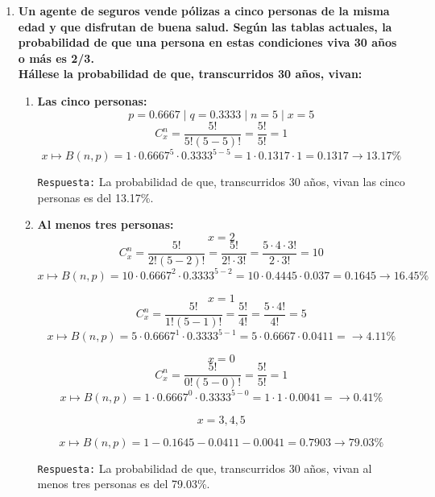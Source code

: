 \documentclass[12pt]{article}
\begin{document}
\begin{enumerate}[label=\textbf{\arabic*.}]
\begin{enumerate}[label=\textbf{\alph*.}]
        \end{enumerate}


        \newpage
        \item \textbf{Un agente de seguros vende pólizas a cinco personas de la misma edad y que disfrutan
        de buena salud. Según las tablas actuales, la probabilidad de que una persona en estas
        condiciones viva 30 años o más es 2/3.\\
        Hállese la probabilidad de que, transcurridos 30 años, vivan:}

        \begin{enumerate}[label=\textbf{\alph*.}]
            \item \textbf{Las cinco personas:}
            \[p = 0.6667 \mid q = 0.3333 \mid n = 5 \mid x = 5\]
            \[C^{n}_{x} = \frac{5!}{5!(5-5)!} = \frac{5!}{5!} = 1\]
            \[x \mapsto B(n, p) = 1 \cdot 0.6667^{5} \cdot 0.3333^{5-5} = 1 \cdot 0.1317 \cdot 1 = 0.1317 \rightarrow 13.17\%\]
            
            \texttt{Respuesta:} La probabilidad de que, transcurridos 30 años, vivan las cinco personas es del 13.17\%.

            \item \textbf{Al menos tres personas:}
            \[x = 2\]
            \[C^{n}_{x} = \frac{5!}{2!(5-2)!} = \frac{5!}{2!\cdot 3!} = \frac{5 \cdot 4\cdot 3!}{2\cdot 3!} = 10\]
            \[x \mapsto B(n, p) = 10 \cdot 0.6667^{2} \cdot 0.3333^{5-2} = 10 \cdot 0.4445 \cdot 0.037 = 0.1645 \rightarrow 16.45\%\]

            \[x = 1\]
            \[C^{n}_{x} = \frac{5!}{1!(5-1)!} = \frac{5!}{4!} = \frac{5 \cdot 4!}{4!} = 5\]
            \[x \mapsto B(n, p) = 5 \cdot 0.6667^{1} \cdot 0.3333^{5-1} = 5 \cdot 0.6667 \cdot 0.0411 =  \rightarrow 4.11\%\]

            \[x = 0\]
            \[C^{n}_{x} = \frac{5!}{0!(5-0)!} = \frac{5!}{5!} = 1\]
            \[x \mapsto B(n, p) = 1 \cdot 0.6667^{0} \cdot 0.3333^{5-0} = 1 \cdot 1 \cdot 0.0041 =  \rightarrow 0.41\%\]

            \[x = 3, 4, 5\]
            
            \[x \mapsto B(n, p) = 1 - 0.1645 - 0.0411 - 0.0041 = 0.7903 \rightarrow 79.03\%\]
            
            \texttt{Respuesta:} La probabilidad de que, transcurridos 30 años, vivan al menos tres personas es del 79.03\%.


\end{enumerate}
\end{enumerate}
\end{document}
